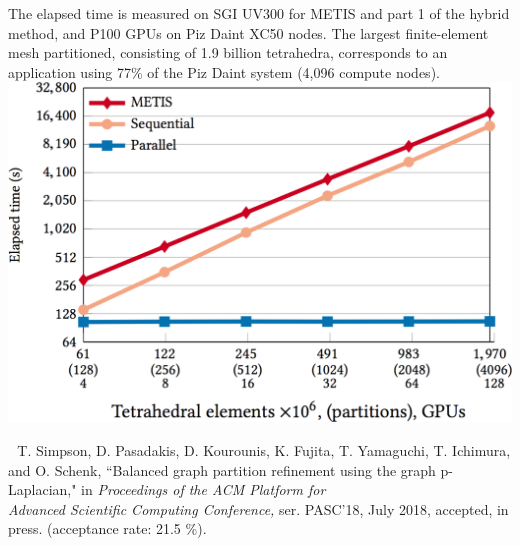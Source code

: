 \documentclass[12pt]{article}
\begin{document}
{{{\begin{multicols}{3}
                      
\columnbreak
                                 
\begin{center}
\end{center}
The elapsed time is measured on SGI UV300 for METIS and part 1 of the hybrid method, and P100 GPUs on Piz Daint XC50 nodes. The largest finite-element mesh partitioned, consisting of 1.9 billion tetrahedra, corresponds to an application using 77\% of the Piz Daint system (4,096 compute nodes).
 \\
 \vspace{+1cm}
 \includegraphics[width=0.90\columnwidth]{figures/scalability.png}


\end{multicols}}

} %

}



\,\, T. Simpson, D. Pasadakis, D. Kourounis, K. Fujita, T. Yamaguchi, T. Ichimura, and O. Schenk, ``Balanced graph partition refinement using the graph p-Laplacian," in {\it Proceedings of the ACM Platform for \\ Advanced Scientific Computing Conference,} ser. PASC'18, July 2018, accepted, in press. (acceptance rate: 21.5 \%).


\end{document}
